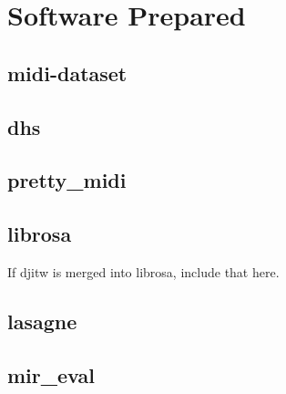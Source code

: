 \chapter{Software Prepared}

\section{midi-dataset}

\section{dhs}

\section{pretty\_midi}
\label{sec:pretty_midi}

\section{librosa}

If djitw is merged into librosa, include that here.

\section{lasagne}

\section{mir\_eval}
